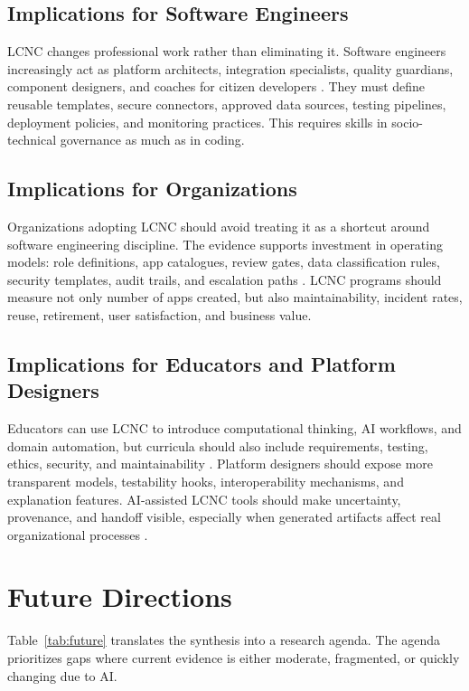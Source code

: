 \documentclass[conference]{IEEEtran}
\begin{document}
\subsection{Implications for Software Engineers}
LCNC changes professional work rather than eliminating it. Software engineers increasingly act as platform architects, integration specialists, quality guardians, component designers, and coaches for citizen developers \cite{p16,p30,p47,p49}. They must define reusable templates, secure connectors, approved data sources, testing pipelines, deployment policies, and monitoring practices. This requires skills in socio-technical governance as much as in coding.

\subsection{Implications for Organizations}
Organizations adopting LCNC should avoid treating it as a shortcut around software engineering discipline. The evidence supports investment in operating models: role definitions, app catalogues, review gates, data classification rules, security templates, audit trails, and escalation paths \cite{p12,p13,p15,p18}. LCNC programs should measure not only number of apps created, but also maintainability, incident rates, reuse, retirement, user satisfaction, and business value.

\subsection{Implications for Educators and Platform Designers}
Educators can use LCNC to introduce computational thinking, AI workflows, and domain automation, but curricula should also include requirements, testing, ethics, security, and maintainability \cite{p28,p37,p44,p50}. Platform designers should expose more transparent models, testability hooks, interoperability mechanisms, and explanation features. AI-assisted LCNC tools should make uncertainty, provenance, and handoff visible, especially when generated artifacts affect real organizational processes \cite{p08,p31,p42}.

\section{Future Directions}
Table~\ref{tab:future} translates the synthesis into a research agenda. The agenda prioritizes gaps where current evidence is either moderate, fragmented, or quickly changing due to AI.
\end{document}
